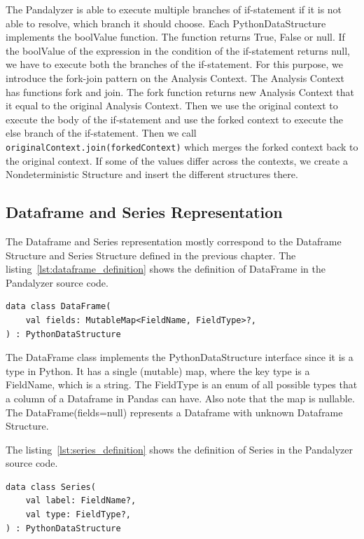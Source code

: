 The Pandalyzer is able to execute multiple branches of if-statement if it is not able to resolve, which branch it should
choose.
Each PythonDataStructure implements the boolValue function.
The function returns True, False or null.
If the boolValue of the expression in the condition of the if-statement returns null, we have to execute both the
branches of the if-statement.
For this purpose, we introduce the fork-join pattern on the Analysis Context.
The Analysis Context has functions fork and join.
The fork function returns new Analysis Context that it equal to the original Analysis Context.
Then we use the original context to execute the body of the if-statement and use the forked context to execute
the else branch of the if-statement.
Then we call \verb|originalContext.join(forkedContext)| which merges the forked context back to the original context.
If some of the values differ across the contexts, we create a Nondeterministic Structure and insert the different
structures there.

\subsection{Dataframe and Series Representation}\label{subsec:dataframe-and-series-representation}

The Dataframe and Series representation mostly correspond to the Dataframe Structure and Series Structure defined in the
previous chapter.
The listing~\ref{lst:dataframe_definition} shows the definition of DataFrame in the Pandalyzer source code.

\begin{lstlisting}[caption=Kotlin definition of the Dataframe, label={lst:dataframe_definition}, captionpos=b]
data class DataFrame(
    val fields: MutableMap<FieldName, FieldType>?,
) : PythonDataStructure
\end{lstlisting}

The DataFrame class implements the PythonDataStructure interface since it is a type in Python.
It has a single (mutable) map, where the key type is a FieldName, which is a string.
The FieldType is an enum of all possible types that a column of a Dataframe in Pandas can have.
Also note that the map is nullable.
The DataFrame(fields=null) represents a Dataframe with unknown Dataframe Structure.

The listing~\ref{lst:series_definition} shows the definition of Series in the Pandalyzer source code.

\begin{lstlisting}[caption=Kotlin definition of the Series, label={lst:series_definition}, captionpos=b]
data class Series(
    val label: FieldName?,
    val type: FieldType?,
) : PythonDataStructure
\end{lstlisting}

